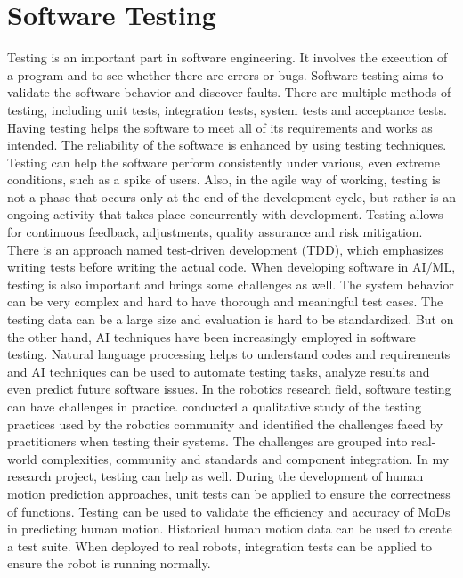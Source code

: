 \documentclass[11pt]{article}
\begin{document}
\section{Software Testing}
Testing is an important part in software engineering. It involves the execution of a program and to see whether there are errors or bugs. Software testing aims to validate the software behavior and discover faults. There are multiple methods of testing, including unit tests, integration tests, system tests and acceptance tests. Having testing helps the software to meet all of its requirements and works as intended. The reliability of the software is enhanced by using testing techniques. Testing can help the software perform consistently under various, even extreme conditions, such as a spike of users. Also, in the agile way of working, testing is not a phase that occurs only at the end of the development cycle, but rather is an ongoing activity that takes place concurrently with development. Testing allows for continuous feedback, adjustments, quality assurance and risk mitigation. There is an approach named test-driven development (TDD), which emphasizes writing tests before writing the actual code. When developing software in AI/ML, testing is also important and brings some challenges as well. The system behavior can be very complex and hard to have thorough and meaningful test cases.  The testing data can be a large size and evaluation is hard to be standardized. But on the other hand,  AI techniques have been increasingly employed in software testing. Natural language processing helps to understand codes and requirements and AI techniques can be used to automate testing tasks, analyze results and even predict future software issues. In the robotics research field, software testing can have challenges in practice. \cite{testing} conducted a qualitative study of the testing practices used by the robotics community and identified the challenges faced by practitioners when testing their systems. The challenges are grouped into real-world complexities, community and standards and component integration. In my research project, testing can help as well. During the development of human motion prediction approaches, unit tests can be applied to ensure the correctness of functions. Testing can be used to validate the efficiency and accuracy of MoDs in predicting human motion. Historical human motion data can be used to create a test suite. When deployed to real robots, integration tests can be applied to ensure the robot is running normally. 
\end{document}
